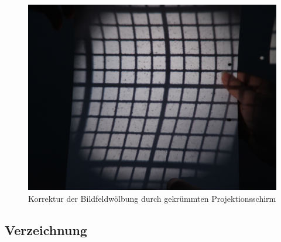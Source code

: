 \begin{figure}[h!]
	\includegraphics[width=\linewidth]{img/Bildwoelbung/Prakt_Linsenfehler_2015_06_04_076}
	\caption{Korrektur der Bildfeldwölbung durch gekrümmten Projektionsschirm}
	\label{fig:bildwoelbung_korrigiert}
\end{figure}

\subsection{Verzeichnung}

